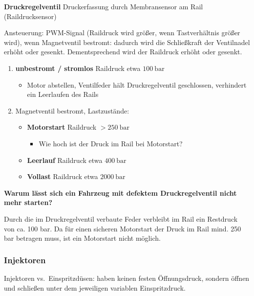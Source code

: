 \textbf{Druckregelventil} Druckerfassung durch Membransensor am Rail
(Raildrucksensor)

Ansteuerung: PWM-Signal (Raildruck wird größer, wenn Tastverhältnis
größer wird), wenn Magnetventil bestromt: dadurch wird die Schließkraft
der Ventilnadel erhöht oder gesenkt. Dementsprechend wird der Raildruck
erhöht oder gesenkt.

\begin{enumerate}
\item
  \textbf{unbestromt / stromlos} Raildruck etwa $100~\text{bar}$

  \begin{itemize}
  \item
    Motor abstellen, Ventilfeder hält Druckregelventil geschlossen,
    verhindert ein Leerlaufen des Rails
  \end{itemize}
\item
  Magnetventil bestromt, Lastzustände:

  \begin{itemize}
  \item
    \textbf{Motorstart} Raildruck $> 250~\text{bar}$

    \begin{itemize}
    \item
      Wie hoch ist der Druck im Rail bei Motorstart?
    \end{itemize}
  \item
    \textbf{Leerlauf} Raildruck etwa $400~\text{bar}$
  \item
    \textbf{Vollast} Raildruck etwa $2000~\text{bar}$
  \end{itemize}
\end{enumerate}

\textbf{Warum lässt sich ein Fahrzeug mit defektem Druckregelventil
nicht mehr starten?}

Durch die im Druckregelventil verbaute Feder verbleibt im Rail ein
Restdruck von ca. 100 bar. Da für einen sicheren Motorstart der Druck im
Rail mind. 250 bar betragen muss, ist ein Motorstart nicht möglich.

\newpage

\subsubsection{Injektoren}\label{injektoren}

Injektoren vs.~Einspritzdüsen: haben keinen festen Öffnungsdruck,
sondern öffnen und schließen unter dem jeweiligen variablen
Einspritzdruck.


